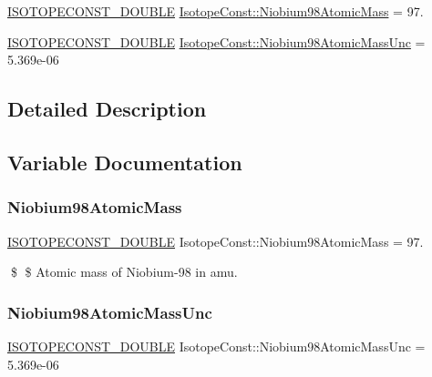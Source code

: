 \begin{DoxyCompactItemize}
\item 
\mbox{\hyperlink{group___isotope_const-_macros_ga8f45a7272ce02c0b4c65c44636ed719a}{I\+S\+O\+T\+O\+P\+E\+C\+O\+N\+S\+T\+\_\+\+D\+O\+U\+B\+LE}} \mbox{\hyperlink{group___isotope_const-_niobium-_nb98_gaed609559a32995c231c7b8e9d959e378}{Isotope\+Const\+::\+Niobium98\+Atomic\+Mass}} = 97.
\item 
\mbox{\hyperlink{group___isotope_const-_macros_ga8f45a7272ce02c0b4c65c44636ed719a}{I\+S\+O\+T\+O\+P\+E\+C\+O\+N\+S\+T\+\_\+\+D\+O\+U\+B\+LE}} \mbox{\hyperlink{group___isotope_const-_niobium-_nb98_gad3061163adb0b153f393bafdbc59e1ae}{Isotope\+Const\+::\+Niobium98\+Atomic\+Mass\+Unc}} = 5.\+369e-\/06
\end{DoxyCompactItemize}


\subsection{Detailed Description}


\subsection{Variable Documentation}
\mbox{\label{group___isotope_const-_niobium-_nb98_gaed609559a32995c231c7b8e9d959e378}} 
\subsubsection{\texorpdfstring{Niobium98\+Atomic\+Mass}{Niobium98AtomicMass}}
{\footnotesize\ttfamily \mbox{\hyperlink{group___isotope_const-_macros_ga8f45a7272ce02c0b4c65c44636ed719a}{I\+S\+O\+T\+O\+P\+E\+C\+O\+N\+S\+T\+\_\+\+D\+O\+U\+B\+LE}} Isotope\+Const\+::\+Niobium98\+Atomic\+Mass = 97.}

\$ \$ Atomic mass of Niobium-\/98 in amu. \mbox{\label{group___isotope_const-_niobium-_nb98_gad3061163adb0b153f393bafdbc59e1ae}} 
\subsubsection{\texorpdfstring{Niobium98\+Atomic\+Mass\+Unc}{Niobium98AtomicMassUnc}}
{\footnotesize\ttfamily \mbox{\hyperlink{group___isotope_const-_macros_ga8f45a7272ce02c0b4c65c44636ed719a}{I\+S\+O\+T\+O\+P\+E\+C\+O\+N\+S\+T\+\_\+\+D\+O\+U\+B\+LE}} Isotope\+Const\+::\+Niobium98\+Atomic\+Mass\+Unc = 5.\+369e-\/06}

